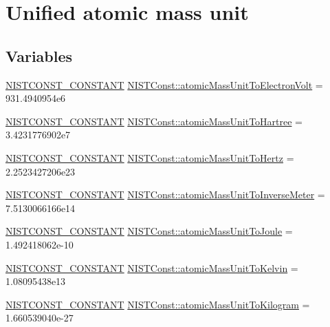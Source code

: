 \hypertarget{group___n_i_s_t_const-_atomic_mass_unit}{}\section{Unified atomic mass unit}
\label{group___n_i_s_t_const-_atomic_mass_unit}
\subsection*{Variables}
\begin{DoxyCompactItemize}
\item 
\mbox{\hyperlink{_n_i_s_t_const_8hpp_a2b0fc1d7452373f816175dd86ce26729}{N\+I\+S\+T\+C\+O\+N\+S\+T\+\_\+\+C\+O\+N\+S\+T\+A\+NT}} \mbox{\hyperlink{group___n_i_s_t_const-_atomic_mass_unit_ga25c8b97ae8d15ad0a827672a167161fc}{N\+I\+S\+T\+Const\+::atomic\+Mass\+Unit\+To\+Electron\+Volt}} = 931.\+4940954e6
\item 
\mbox{\hyperlink{_n_i_s_t_const_8hpp_a2b0fc1d7452373f816175dd86ce26729}{N\+I\+S\+T\+C\+O\+N\+S\+T\+\_\+\+C\+O\+N\+S\+T\+A\+NT}} \mbox{\hyperlink{group___n_i_s_t_const-_atomic_mass_unit_gabc1d9560508c08af70cd236ca08dfbff}{N\+I\+S\+T\+Const\+::atomic\+Mass\+Unit\+To\+Hartree}} = 3.\+4231776902e7
\item 
\mbox{\hyperlink{_n_i_s_t_const_8hpp_a2b0fc1d7452373f816175dd86ce26729}{N\+I\+S\+T\+C\+O\+N\+S\+T\+\_\+\+C\+O\+N\+S\+T\+A\+NT}} \mbox{\hyperlink{group___n_i_s_t_const-_atomic_mass_unit_ga202ebb9eeb0f916c91b074d07ba403d5}{N\+I\+S\+T\+Const\+::atomic\+Mass\+Unit\+To\+Hertz}} = 2.\+2523427206e23
\item 
\mbox{\hyperlink{_n_i_s_t_const_8hpp_a2b0fc1d7452373f816175dd86ce26729}{N\+I\+S\+T\+C\+O\+N\+S\+T\+\_\+\+C\+O\+N\+S\+T\+A\+NT}} \mbox{\hyperlink{group___n_i_s_t_const-_atomic_mass_unit_gaa66e75563e7a7c28bc3c4b5c4ab482a1}{N\+I\+S\+T\+Const\+::atomic\+Mass\+Unit\+To\+Inverse\+Meter}} = 7.\+5130066166e14
\item 
\mbox{\hyperlink{_n_i_s_t_const_8hpp_a2b0fc1d7452373f816175dd86ce26729}{N\+I\+S\+T\+C\+O\+N\+S\+T\+\_\+\+C\+O\+N\+S\+T\+A\+NT}} \mbox{\hyperlink{group___n_i_s_t_const-_atomic_mass_unit_ga8c1405e0299d1388f1452bf4e04778f9}{N\+I\+S\+T\+Const\+::atomic\+Mass\+Unit\+To\+Joule}} = 1.\+492418062e-\/10
\item 
\mbox{\hyperlink{_n_i_s_t_const_8hpp_a2b0fc1d7452373f816175dd86ce26729}{N\+I\+S\+T\+C\+O\+N\+S\+T\+\_\+\+C\+O\+N\+S\+T\+A\+NT}} \mbox{\hyperlink{group___n_i_s_t_const-_atomic_mass_unit_ga74d5a7e0d6f6182731b839a578353769}{N\+I\+S\+T\+Const\+::atomic\+Mass\+Unit\+To\+Kelvin}} = 1.\+08095438e13
\item 
\mbox{\hyperlink{_n_i_s_t_const_8hpp_a2b0fc1d7452373f816175dd86ce26729}{N\+I\+S\+T\+C\+O\+N\+S\+T\+\_\+\+C\+O\+N\+S\+T\+A\+NT}} \mbox{\hyperlink{group___n_i_s_t_const-_atomic_mass_unit_ga72ba2b08855b26ea2477c3e8104bbc16}{N\+I\+S\+T\+Const\+::atomic\+Mass\+Unit\+To\+Kilogram}} = 1.\+660539040e-\/27
\end{DoxyCompactItemize}



